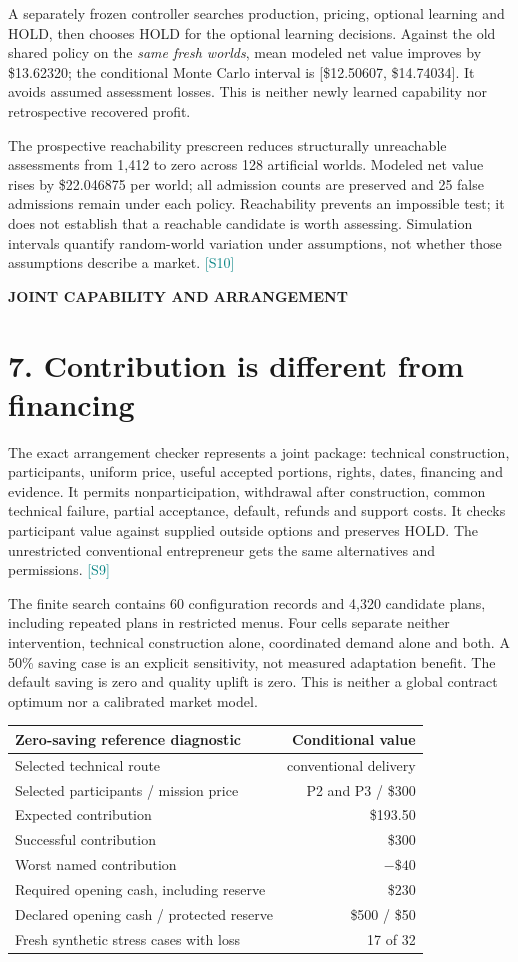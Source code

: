 \documentclass[10pt,letterpaper]{article}
\newcommand{\src}[1]{\textcolor{Teal}{\scriptsize[#1]}}
\newcommand{\eyebrow}[1]{{\small\bfseries\color{Gold}\MakeUppercase{#1}}\par}
\newcommand{\pagename}[2]{\eyebrow{#1}\section*{#2}}
\newcommand{\HoldGain}{13.62320}
\newcommand{\HoldLow}{12.50607}
\newcommand{\HoldHigh}{14.74034}
\newcommand{\PrescreenGain}{22.046875}
\newcommand{\ArrangementExpected}{193.50}
\newcommand{\ArrangementSuccess}{300}
\newcommand{\ArrangementOpening}{230}
\begin{document}
A separately frozen controller searches production, pricing, optional learning and HOLD, then chooses HOLD for the optional learning decisions. Against the old shared policy on the \emph{same fresh worlds}, mean modeled net value improves by \$\HoldGain{}; the conditional Monte Carlo interval is [\$\HoldLow{}, \$\HoldHigh{}]. It avoids assumed assessment losses. This is neither newly learned capability nor retrospective recovered profit.

The prospective reachability prescreen reduces structurally unreachable assessments from 1,412 to zero across 128 artificial worlds. Modeled net value rises by \$\PrescreenGain{} per world; all admission counts are preserved and 25 false admissions remain under each policy. Reachability prevents an impossible test; it does not establish that a reachable candidate is worth assessing. Simulation intervals quantify random-world variation under assumptions, not whether those assumptions describe a market. \src{S10}

\newpage
\pagename{Joint capability and arrangement}{7. Contribution is different from financing}
The exact arrangement checker represents a joint package: technical construction, participants, uniform price, useful accepted portions, rights, dates, financing and evidence. It permits nonparticipation, withdrawal after construction, common technical failure, partial acceptance, default, refunds and support costs. It checks participant value against supplied outside options and preserves HOLD. The unrestricted conventional entrepreneur gets the same alternatives and permissions. \src{S9}

The finite search contains 60 configuration records and 4,320 candidate plans, including repeated plans in restricted menus. Four cells separate neither intervention, technical construction alone, coordinated demand alone and both. A 50\% saving case is an explicit sensitivity, not measured adaptation benefit. The default saving is zero and quality uplift is zero. This is neither a global contract optimum nor a calibrated market model.

\begin{center}
\begin{tabular}{@{}lr@{}}
\toprule
\textbf{Zero-saving reference diagnostic} & \textbf{Conditional value} \\
\midrule
Selected technical route & conventional delivery \\
Selected participants / mission price & P2 and P3 / \$300 \\
Expected contribution & \$\ArrangementExpected{} \\
Successful contribution & \$\ArrangementSuccess{} \\
Worst named contribution & $-\$40$ \\
Required opening cash, including reserve & \$\ArrangementOpening{} \\
Declared opening cash / protected reserve & \$500 / \$50 \\
Fresh synthetic stress cases with loss & 17 of 32 \\
\bottomrule
\end{tabular}
\end{center}
\end{document}
